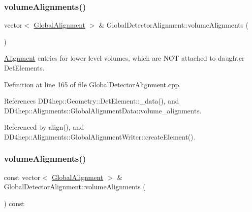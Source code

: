 \subsubsection{\texorpdfstring{volume\+Alignments()}{volumeAlignments()}\hspace{0.1cm}{\footnotesize\ttfamily [1/2]}}
{\footnotesize\ttfamily vector$<$ \hyperlink{class_d_d4hep_1_1_alignments_1_1_global_alignment}{Global\+Alignment} $>$ \& Global\+Detector\+Alignment\+::volume\+Alignments (\begin{DoxyParamCaption}{ }\end{DoxyParamCaption})}



\hyperlink{class_d_d4hep_1_1_alignments_1_1_alignment}{Alignment} entries for lower level volumes, which are N\+OT attached to daughter Det\+Elements. 



Definition at line 165 of file Global\+Detector\+Alignment.\+cpp.



References D\+D4hep\+::\+Geometry\+::\+Det\+Element\+::\+\_\+data(), and D\+D4hep\+::\+Alignments\+::\+Global\+Alignment\+Data\+::volume\+\_\+alignments.



Referenced by align(), and D\+D4hep\+::\+Alignments\+::\+Global\+Alignment\+Writer\+::create\+Element().

\hypertarget{class_d_d4hep_1_1_alignments_1_1_global_detector_alignment_a5b1f3416dd0ba2b7e75973c2efdd1e67}{}\label{class_d_d4hep_1_1_alignments_1_1_global_detector_alignment_a5b1f3416dd0ba2b7e75973c2efdd1e67} 
\subsubsection{\texorpdfstring{volume\+Alignments()}{volumeAlignments()}\hspace{0.1cm}{\footnotesize\ttfamily [2/2]}}
{\footnotesize\ttfamily const vector$<$ \hyperlink{class_d_d4hep_1_1_alignments_1_1_global_alignment}{Global\+Alignment} $>$ \& Global\+Detector\+Alignment\+::volume\+Alignments (\begin{DoxyParamCaption}{ }\end{DoxyParamCaption}) const}



